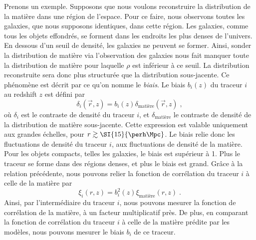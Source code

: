 Prenons un exemple. Supposons que nous voulons reconstruire la distribution de la matière dans une région de l'espace. Pour ce faire, nous observons toutes les galaxies, que nous supposons identiques, dans cette région.
Les galaxies, comme tous les objets effondrés, se forment dans les endroits les plus denses de l'univers.
En dessous d'un seuil de densité, les galaxies ne peuvent se former.
Ainsi, sonder la distribution de matière via l'observation des galaxies nous fait manquer toute la distribution de matière pour laquelle $\rho$ est inférieur à ce seuil.
La distribution reconstruite sera donc plus structurée que la distribution sous-jacente. Ce phénomène est décrit par ce qu'on nomme le \emph{biais}. Le biais $b_i(z)$ du traceur $i$ au redshift $z$ est défini par
\begin{equation}
  \label{eq:biais1}
  \delta_{i}(\vec r, z) = b_{i}(z) \delta_{\mathrm{matière}}(\vec r, z) \; , 
\end{equation}
où $\delta_{i}$ est le contraste de densité du traceur $i$, et $\delta_{\mathrm{matière}}$ le contraste de densité de la distribution de matière sous-jacente. Cette expression est valable uniquement aux grandes échelles, pour $r \gtrsim \SI{15}{\perh\Mpc}$. Le biais relie donc les fluctuations de densité du traceur $i$, aux fluctuations de densité de la matière. Pour les objets compacts, telles les galaxies, le biais est supérieur à 1. Plus le traceur se forme dans des régions denses, et plus le biais est grand. Grâce à la relation précédente, nous pouvons relier la fonction de corrélation du traceur $i$ à celle de la matière par
\begin{equation}
  \label{eq:biais2}
  \xi_{i}(r, z) = b_{i}^2(z) \xi_{\mathrm{matière}}(r, z)  \; .
\end{equation}
Ainsi, par l'intermédiaire du traceur $i$, nous pouvons mesurer la fonction de corrélation de la matière, à un facteur multiplicatif près. De plus, en comparant la fonction de corrélation du traceur $i$ à celle de la matière prédite par les modèles, nous pouvons mesurer le biais $b_{i}$ de ce traceur. 
